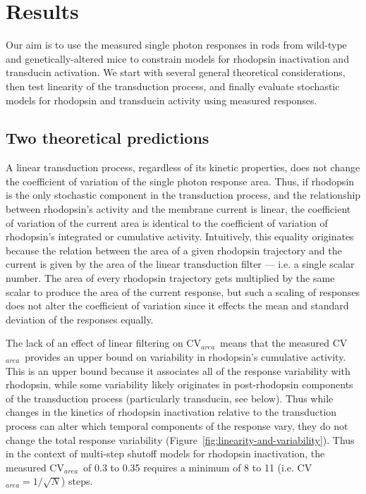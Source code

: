 \documentclass[12pt]{article}
\def\CVArea{CV$_{area}$~}
\begin{document}
 
\section{Results}

Our aim is to use the measured single photon responses in rods from wild-type and genetically-altered mice to constrain models for rhodopsin inactivation and transducin activation.  We start with several general theoretical considerations, then test linearity of the transduction process, and finally evaluate stochastic models for rhodopsin and transducin activity using measured responses.  
 
\subsection{Two theoretical predictions}

A linear transduction process, regardless of its kinetic properties, does not change the coefficient of variation of the single photon response area.  Thus, if rhodopsin is the only stochastic component in the transduction process, and the relationship between rhodopsin's activity and the membrane current is linear, the coefficient of variation of the current area is identical to the coefficient of variation of rhodopsin's integrated or cumulative activity.  Intuitively, this equality originates because the relation between the area of a given rhodopsin trajectory and the current is given by the area of the linear transduction filter --- i.e. a single scalar number.  The area of every rhodopsin trajectory gets multiplied by the same scalar to produce the area of the current response, but such a scaling of responses does not alter the coefficient of variation since it effects the mean and standard deviation of the responses equally.  

The lack of an effect of linear filtering on \CVArea means that the measured \CVArea provides an upper bound on variability in rhodopsin's cumulative activity.   This is an upper bound because it associates all of the response variability with rhodopsin, while some variability likely originates in post-rhodopsin components of the transduction process (particularly transducin, see below).  Thus while changes in the kinetics of rhodopsin inactivation relative to the transduction process can alter which temporal components of the response vary, they do not change the total response variability (Figure~\ref{fig:linearity-and-variability}).  Thus in the context of multi-step shutoff models for rhodopsin inactivation, the measured \CVArea of 0.3 to 0.35 requires a minimum of 8 to 11 (i.e. CV$_{area} = 1/\sqrt{N}$) steps. 
\end{document}
